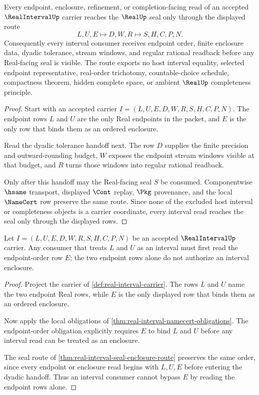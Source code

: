 \begin{theorem}
\label{thm:real-interval-seal-enclosure-route}
Every endpoint, enclosure, refinement, or completion-facing read of an accepted $\RealIntervalUp$ carrier reaches the $\RealUp$ seal only through the displayed route
$$
L,U,E \longmapsto D,W,R \longmapsto S,H,C,P,N .
$$
Consequently every interval consumer receives endpoint order, finite enclosure data, dyadic tolerance, stream windows, and regular rational readback before any Real-facing seal is visible. The route exports no host interval equality, selected endpoint representative, real-order trichotomy, countable-choice schedule, compactness theorem, hidden complete space, or ambient $\RealUp$ completeness principle.
\end{theorem}
\begin{proof}
Start with an accepted carrier $I=(L,U,E,D,W,R,S,H,C,P,N)$. The endpoint rows $L$ and $U$ are the only Real endpoints in the packet, and $E$ is the only row that binds them as an ordered enclosure.

Read the dyadic tolerance handoff next. The row $D$ supplies the finite precision and outward-rounding budget, $W$ exposes the endpoint stream windows visible at that budget, and $R$ turns those windows into regular rational readback.

Only after this handoff may the Real-facing seal $S$ be consumed. Componentwise $\hsame$ transport, displayed $\Cont$ replay, $\Pkg$ provenance, and the local $\NameCert$ row preserve the same route. Since none of the excluded host interval or completeness objects is a carrier coordinate, every interval read reaches the seal only through the displayed rows.
\end{proof}

\begin{theorem}
\label{thm:real-interval-endpoint-order-obligation}
Let $I=(L,U,E,D,W,R,S,H,C,P,N)$ be an accepted $\RealIntervalUp$ carrier. Any consumer that treats $L$ and $U$ as an interval must first read the endpoint-order row $E$; the two endpoint rows alone do not authorize an interval enclosure.
\end{theorem}
\begin{proof}
Project the carrier of \autoref{def:real-interval-carrier}. The rows $L$ and $U$ name the two endpoint Real rows, while $E$ is the only displayed row that binds them as an ordered enclosure.

Now apply the local obligations of \autoref{thm:real-interval-namecert-obligations}. The endpoint-order obligation explicitly requires $E$ to bind $L$ and $U$ before any interval read can be treated as an enclosure.

The seal route of \autoref{thm:real-interval-seal-enclosure-route} preserves the same order, since every endpoint or enclosure read begins with $L,U,E$ before entering the dyadic handoff. Thus an interval consumer cannot bypass $E$ by reading the endpoint rows alone.
\end{proof}

